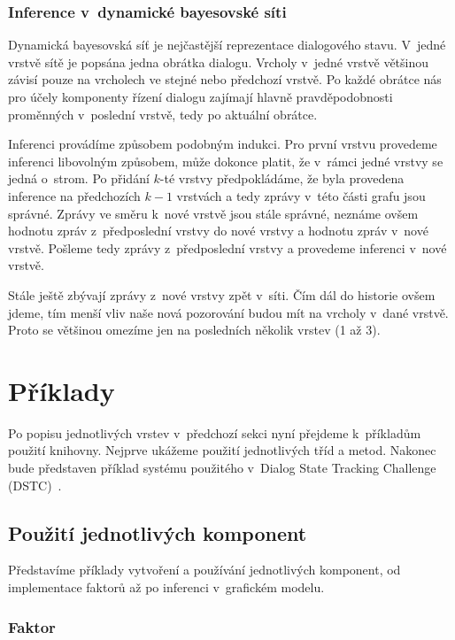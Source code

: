 \subsubsection{Inference v~dynamické bayesovské síti}

Dynamická bayesovská síť je nejčastější reprezentace dialogového stavu.
V~jedné vrstvě sítě je popsána jedna obrátka dialogu.
Vrcholy v~jedné vrstvě většinou závisí pouze na vrcholech ve stejné nebo předchozí vrstvě.
Po každé obrátce nás pro účely komponenty řízení dialogu zajímají hlavně pravděpodobnosti proměnných v~poslední vrstvě, tedy po aktuální obrátce.

Inferenci provádíme způsobem podobným indukci.
Pro první vrstvu provedeme inferenci libovolným způsobem, může dokonce platit, že v~rámci jedné vrstvy se jedná o~strom.
Po přidání $k$-té vrstvy předpokládáme, že byla provedena inference na předchozích $k-1$ vrstvách a tedy zprávy v~této části grafu jsou správné.
Zprávy ve směru k~nové vrstvě jsou stále správné, neznáme ovšem hodnotu zpráv z~předposlední vrstvy do nové vrstvy a hodnotu zpráv v~nové vrstvě.
Pošleme tedy zprávy z~předposlední vrstvy a provedeme inferenci v~nové vrstvě.

Stále ještě zbývají zprávy z~nové vrstvy zpět v~síti.
Čím dál do historie ovšem jdeme, tím menší vliv naše nová pozorování budou mít na vrcholy v~dané vrstvě.
Proto se většinou omezíme jen na posledních několik vrstev (1 až 3).

\section{Příklady}

Po popisu jednotlivých vrstev v~předchozí sekci nyní přejdeme k~příkladům použití knihovny.
Nejprve ukážeme použití jednotlivých tříd a metod.
Nakonec bude představen příklad systému použitého v~Dialog State Tracking Challenge (DSTC)~\cite{dstc2013}.

\subsection{Použití jednotlivých komponent}
\label{sec:usage}

Představíme příklady vytvoření a používání jednotlivých komponent, od implementace faktorů až po inferenci v~grafickém modelu.

\subsubsection{Faktor}

